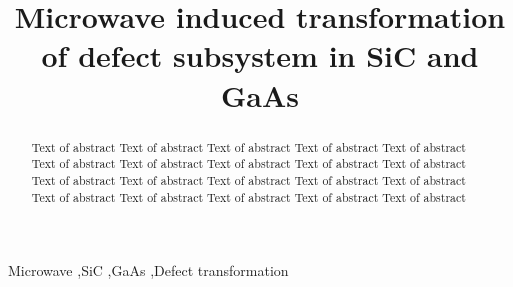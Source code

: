 \documentclass[final,3p,times,twocolumn,authoryear]{elsarticle}
\begin{document}
\begin{frontmatter}



\title{Microwave induced transformation of defect subsystem in SiC and GaAs}



\begin{abstract}
Text of abstract Text of abstract Text of abstract Text of abstract
Text of abstract Text of abstract Text of abstract Text of abstract
Text of abstract Text of abstract Text of abstract Text of abstract
Text of abstract Text of abstract Text of abstract Text of abstract
Text of abstract Text of abstract Text of abstract Text of abstract
\end{abstract}



\begin{keyword}
Microwave
\sep SiC
\sep GaAs
\sep Defect transformation
\end{keyword}

\end{frontmatter}
\end{document}

